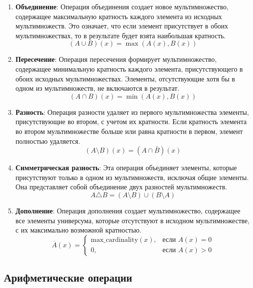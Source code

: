 \documentclass[12pt,a4paper]{article}
\begin{document}
\begin{enumerate}
    \item \textbf{Объединение}: Операция объединения создает новое мультимножество, содержащее максимальную кратность каждого элемента из исходных мультимножеств. Это означает, что если элемент присутствует в обоих мультимножествах, то в результате будет взята наибольшая кратность.
    $$(A \cup B)(x) = \max(A(x), B(x))$$
    
    \item \textbf{Пересечение}: Операция пересечения формирует мультимножество, содержащее минимальную кратность каждого элемента, присутствующего в обоих исходных мультимножествах. Элементы, отсутствующие хотя бы в одном из мультимножеств, не включаются в результат.
    $$(A \cap B)(x) = \min(A(x), B(x))$$
    
    \item \textbf{Разность}: Операция разности удаляет из первого мультимножества элементы, присутствующие во втором, с учетом их кратности. Если кратность элемента во втором мультимножестве больше или равна кратности в первом, элемент полностью удаляется.
    $$(A \setminus B)(x) = (A \cap \bar B)(x)$$
    
    \item \textbf{Симметрическая разность}: Эта операция объединяет элементы, которые присутствуют только в одном из мультимножеств, исключая общие элементы. Она представляет собой объединение двух разностей мультимножеств.
    $$A \triangle B = (A \setminus B) \cup (B \setminus A)$$
    
    \item \textbf{Дополнение}: Операция дополнения создает мультимножество, содержащее все элементы универсума, которые отсутствуют в исходном мультимножестве, с их максимально возможной кратностью.
    $$\overline{A}(x) = \begin{cases} 
        \text{max\_cardinality}(x), & \text{если } A(x) = 0 \\
        0, & \text{если } A(x) > 0
    \end{cases}$$
\end{enumerate}

\subsection{Арифметические операции}
\end{document}
